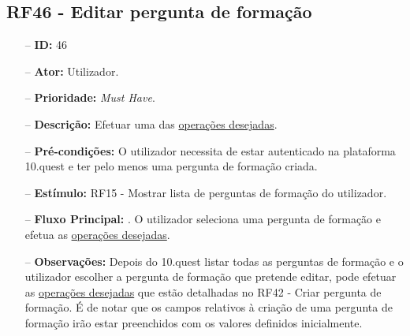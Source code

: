 \subsection{RF46 - Editar pergunta de formação}
\begin{itemize}
	\item[--] \textbf{ID:} 46
	\item[--]  \textbf{Ator:} Utilizador.
	\item[--]  \textbf{Prioridade:} \textit{Must Have}.
	\item[--]  \textbf{Descrição:} Efetuar uma das \underline{operações desejadas}.
	\item[--]  \textbf{Pré-condições:} O utilizador necessita de estar autenticado na plataforma 10.quest e ter pelo menos uma pergunta de formação criada.
	\item[--]  \textbf{Estímulo:} RF15 - Mostrar lista de perguntas de formação do utilizador.
	\item[--]  \textbf{Fluxo Principal:} 
	. O utilizador seleciona uma pergunta de formação e efetua as \underline{operações desejadas}.
	\item[--]  \textbf{Observações:} Depois do 10.quest listar todas as perguntas de formação e o utilizador escolher a pergunta de formação que pretende editar, pode efetuar as \underline{operações desejadas} que estão detalhadas no RF42 - Criar pergunta de formação. É de notar que os campos relativos à criação de uma pergunta de formação irão estar preenchidos com os valores definidos inicialmente.
\end{itemize}
\newpage

